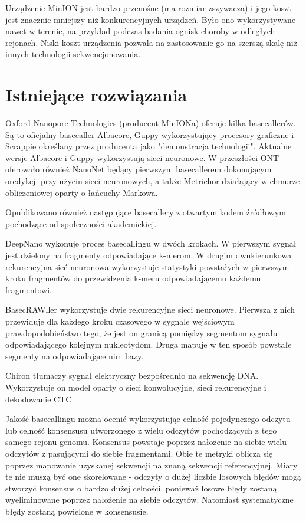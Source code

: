 \documentclass[a4paper,11pt,twoside]{report}
\theoremstyle{definition}
\begin{document}
Urządzenie MinION jest bardzo przenośne (ma rozmiar zszywacza) i jego koszt jest znacznie mniejszy niż konkurencyjnych urządzeń. Było ono wykorzystywane nawet w terenie, na przykład podczas badania ognisk choroby w odległych rejonach\cite{ebola}. Niski koszt urządzenia pozwala na zastosowanie go na szerszą skalę niż innych technologii sekwencjonowania.

\section{Istniejące rozwiązania}

Oxford Nanopore Technologies (producent MinIONa) oferuje kilka basecallerów. Są to oficjalny basecaller Albacore, Guppy wykorzystujący procesory graficzne i Scrappie określany przez producenta jako "demonstracja technologii". Aktualne wersje Albacore i Guppy wykorzystują sieci neuronowe. W przeszłości ONT oferowało również NanoNet będący pierwszym basecallerem dokonującym oredykcji przy użyciu sieci neuronowych, a także Metrichor działający w chmurze obliczeniowej oparty o łańcuchy Markowa. 

Opublikowano również następujące basecallery z otwartym kodem źródłowym pochodzące od społeczności akademickiej.

DeepNano\cite{deepNano} wykonuje proces basecallingu w dwóch krokach. W pierwszym sygnał jest dzielony na fragmenty odpowiadające k-merom. W drugim dwukierunkowa rekurencyjna sieć neuronowa wykorzystuje statystyki powstałych w pierwszym kroku fragmentów do przewidzenia k-meru odpowiadającemu każdemu fragmentowi. 

BasecRAWller\cite{basecrawler} wykorzystuje dwie rekurencyjne sieci neuronowe. Pierwsza z nich przewiduje dla każdego kroku czasowego w sygnale wejściowym prawdopodobieństwo tego, że jest on granicą pomiędzy segmentom sygnału odpowiadającego kolejnym nukleotydom. Druga mapuje w ten sposób powstałe segmenty na odpowiadające nim bazy.

Chiron\cite{chiron} tłumaczy sygnał elektryczny bezpośrednio na sekwencję DNA. Wykorzystuje on model oparty o sieci konwolucyjne, sieci rekurencyjne i dekodowanie CTC.

Jakość basecallingu można ocenić wykorzystując celność pojedynczego odczytu lub celność konsensusu utworzonego z wielu odczytów pochodzących z tego samego rejonu genomu. Konsensus powstaje poprzez nałożenie na siebie wielu odczytów z pasującymi do siebie fragmentami. Obie te metryki oblicza się poprzez mapowanie uzyskanej sekwencji na znaną sekwencji referencyjnej. Miary te nie muszą być one skorelowane - odczyty o dużej liczbie losowych błędów mogą stworzyć konsensus o bardzo dużej celności, ponieważ losowe błędy zostaną wyeliminowane poprzez nałożenie na siebie odczytów. Natomiast systematyczne błędy zostaną powielone w konsensusie\cite{wick}.
\end{document}
